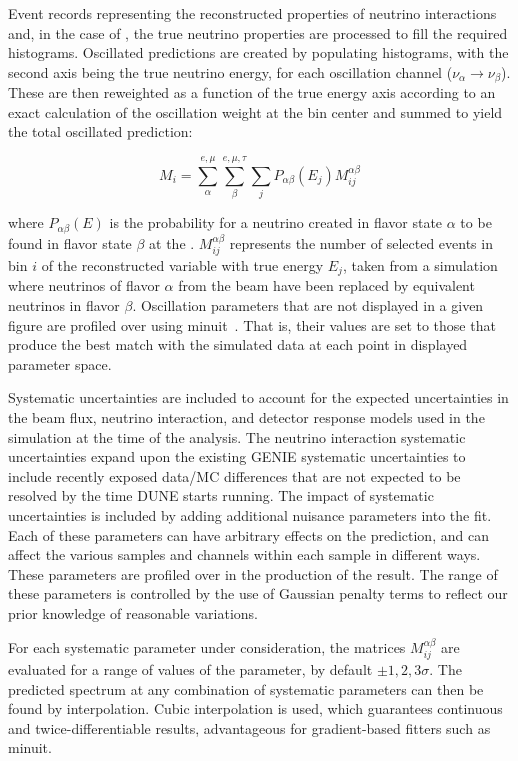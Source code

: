 Event records representing the reconstructed properties of neutrino interactions and, in the case of  , the true neutrino properties are processed to fill the required histograms. Oscillated  predictions are created by populating \twod histograms, with the second axis being the true neutrino energy, for each oscillation channel ($\nu_\alpha\to\nu_\beta$). These are then reweighted as a function of the true energy axis according to an exact calculation of the oscillation weight at the bin center %
and summed to yield the total oscillated prediction:

\begin{equation}
    M_i = \sum_\alpha^{e,\mu}\sum_\beta^{e,\mu,\tau}\sum_j P_{\alpha\beta}(E_j)M_{ij}^{\alpha\beta}
    \label{eqn:cafana_ll}
\end{equation}

where $P_{\alpha\beta}(E)$ is the probability for a neutrino created in flavor state $\alpha$ to be found in flavor state $\beta$ at the . $M_{ij}^{\alpha\beta}$ represents the number of selected events in bin $i$ of the reconstructed variable with true energy $E_j$, taken from a simulation where neutrinos of flavor $\alpha$ from the beam have been replaced by equivalent neutrinos in flavor $\beta$. Oscillation parameters that are not displayed in a given figure are profiled over using {\sc minuit}~\cite{James:1994vla}. That is, their values are set to those that produce the best match with the simulated data at each point in displayed parameter space.

Systematic uncertainties are included to account for the expected uncertainties in the beam flux, neutrino interaction, and detector response models used in the simulation at the time of the analysis. The neutrino interaction systematic uncertainties expand upon the existing GENIE systematic uncertainties to include recently exposed data/MC differences that are not expected to be resolved by the time DUNE starts running. The impact of systematic uncertainties is included by adding additional nuisance parameters into the fit. Each of these parameters can have arbitrary effects on the  prediction, and can affect the various samples and channels within each sample in different ways. These parameters are profiled over in the production of the result. The range of these parameters is controlled by the use of Gaussian penalty terms to reflect our prior knowledge of reasonable variations.

For each systematic parameter under consideration, the matrices $M_{ij}^{\alpha\beta}$ are evaluated for a range of values of the parameter, by default $\pm1,2,3\sigma$. The predicted spectrum at any combination of systematic parameters can then be found by interpolation. Cubic interpolation is used, which guarantees continuous and twice-differentiable results, advantageous for gradient-based fitters such as {\sc minuit}. %

